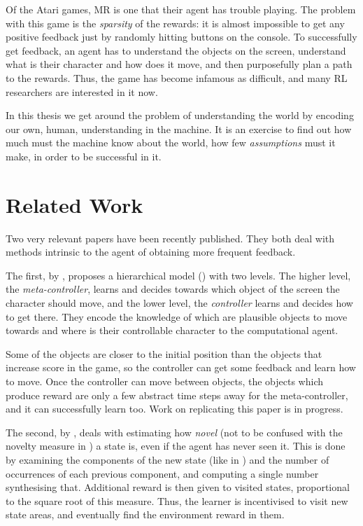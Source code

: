Of the Atari games, \acl{MR} is one that their agent has trouble playing. The
problem with this game is the \emph{sparsity} of the rewards: it is almost
impossible to get any positive feedback just by randomly hitting buttons on the
console. To successfully get feedback, an agent has to understand the objects on
the screen, understand what is their character and how does it move, and then
purposefully plan a path to the rewards. Thus, the game has become infamous as
difficult, and many \ac{RL} researchers are interested in it now.

In this thesis we get around the problem of understanding the world by encoding
our own, human, understanding in the machine. It is an exercise to find out how
much must the machine know about the world, how few \emph{assumptions} must it
make, in order to be successful in it.

\section{Related Work}
Two very relevant papers have been recently published. They both deal with
methods intrinsic to the agent of obtaining more frequent feedback.

The first, by
\citet{kulkarni2016hierarchical}, proposes a hierarchical model
() with two levels. The higher level, the
\emph{meta-controller}, learns and decides towards which object of the screen
the character should move, and the lower level, the \emph{controller} learns and
decides how to get there. They encode the knowledge of which are plausible
objects to move towards and where is their controllable character to the
computational agent.

Some of the objects are closer to the initial position than the objects that
increase score in the game, so the controller can get some feedback and learn
how to move. Once the controller can move between objects, the objects which
produce reward are only a few abstract time steps away for the meta-controller,
and it can successfully learn too. Work on replicating this paper is in
progress.

The second, by \citet{bellemare2016unifying}, deals with estimating how
\emph{novel} (not to be confused with the novelty measure in
) a state is, even if the agent has never seen
it. This is done by examining the components of the new state (like in
) and the number of occurrences of each previous
component, and computing a single number synthesising that. Additional reward is
then given to visited states, proportional to the square root of this measure.
Thus, the learner is incentivised to visit new state areas, and eventually find
the environment reward in them.


